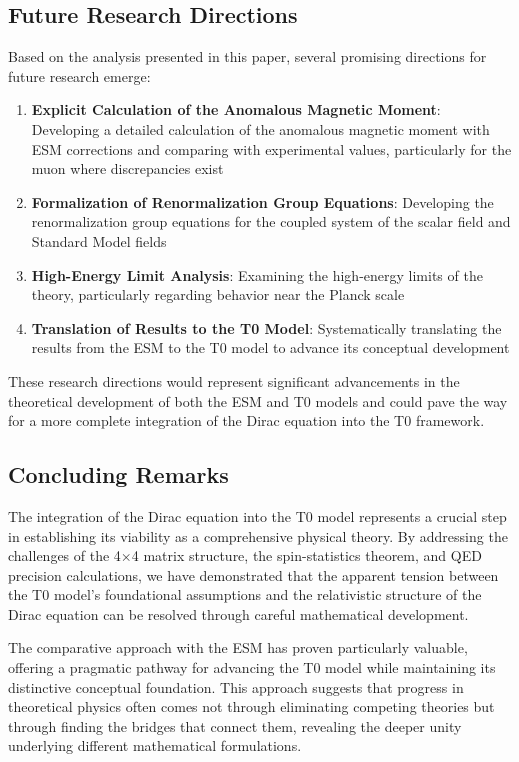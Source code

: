 \documentclass[12pt,a4paper]{article}
\begin{document}
	\subsection{Future Research Directions}
	\label{subsec:future_research}
	
	Based on the analysis presented in this paper, several promising directions for future research emerge:
	
	\begin{enumerate}
		\item \textbf{Explicit Calculation of the Anomalous Magnetic Moment}: Developing a detailed calculation of the anomalous magnetic moment with ESM corrections and comparing with experimental values, particularly for the muon where discrepancies exist
		\item \textbf{Formalization of Renormalization Group Equations}: Developing the renormalization group equations for the coupled system of the scalar field and Standard Model fields
		\item \textbf{High-Energy Limit Analysis}: Examining the high-energy limits of the theory, particularly regarding behavior near the Planck scale
		\item \textbf{Translation of Results to the T0 Model}: Systematically translating the results from the ESM to the T0 model to advance its conceptual development
	\end{enumerate}
	
	These research directions would represent significant advancements in the theoretical development of both the ESM and T0 models and could pave the way for a more complete integration of the Dirac equation into the T0 framework.
	
	\subsection{Concluding Remarks}
	\label{subsec:concluding_remarks}
	
	The integration of the Dirac equation into the T0 model represents a crucial step in establishing its viability as a comprehensive physical theory. By addressing the challenges of the 4$\times$4 matrix structure, the spin-statistics theorem, and QED precision calculations, we have demonstrated that the apparent tension between the T0 model's foundational assumptions and the relativistic structure of the Dirac equation can be resolved through careful mathematical development.
	
	The comparative approach with the ESM has proven particularly valuable, offering a pragmatic pathway for advancing the T0 model while maintaining its distinctive conceptual foundation. This approach suggests that progress in theoretical physics often comes not through eliminating competing theories but through finding the bridges that connect them, revealing the deeper unity underlying different mathematical formulations.
	
\end{document}
